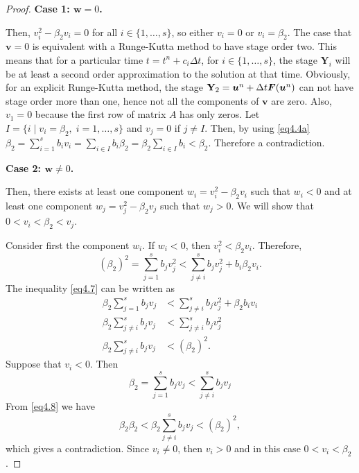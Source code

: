 \begin{proof}
    \noindent \textbf{Case 1: \( \bm{w} = 0 \).}

    Then, \( v_{i}^{2} - \beta_{2}v_{i} = 0 \) for all \( i \in \{1,\dots,s\} \), so either \( v_{i} = 0 \) or \( v_{i} = \beta_{2} \). The case that \( \bm{v} = 0 \) is equivalent with a Runge-Kutta method to have stage order two. This means that for a particular time \( t = t^{n} + c_{i}\Delta t \), for \( i \in \{1, \dots, s\} \), the stage \( \textbf{Y}_{i} \) will be at least a second order approximation to the solution at that time. Obviously, for an explicit Runge-Kutta method, the stage \( \textbf{Y}_{2} = \bm{u}^{n} + \Delta t\bm{F}(\bm{u}^{n}) \) can not have stage order more than one, hence not all the components of \( \bm{v} \) are zero. Also, \( v_{1} = 0 \) because the first row of matrix \( A \) has only zeros. Let \( I = \{ i \;|\; v_{i} = \beta_{2}, \; i = 1,\dots,s \} \) and \( v_{j} = 0 \) if \( j \neq I \). Then, by using \eqref{eq4.4a} \( \beta_{2} = \sum_{i=1}^{s}b_{i}v_{i} = \sum_{i \in I}b_{i}\beta_{2} = \beta_{2}\sum_{i \in I}b_{i} < \beta_{2} \). Therefore a contradiction.
    \newline

    \noindent \textbf{Case 2: \( \bm{w} \neq 0 \).}

    Then, there exists at least one component \( w_{i} = v_{i}^{2} - \beta_{2}v_{i} \) such that \( w_{i} < 0 \) and at least one component \( w_{j} = v_{j}^{2} - \beta_{2}v_{j} \) such that \( w_{j} > 0 \). We will show that \( 0 < v_{i} < \beta_{2} < v_{j} \).

    Consider first the component \( w_{i} \). If \( w_{i} < 0 \), then \( v_{i}^{2} < \beta_{2}v_{i} \). Therefore,
    \begin{equation}\label{eq4.7}
        (\beta_{2})^{2} = \sum_{j=1}^{s}b_{j}v_{j}^{2} < \sum_{j \neq i}^{s}b_{j}v_{j}^{2} + b_{i}\beta_{2}v_{i}.
    \end{equation}
    The inequality \eqref{eq4.7} can be written as
    \begin{equation}\label{eq4.8}
        \begin{split}
            \beta_{2}\sum_{j=1}^{s}b_{j}v_{j} &< \sum_{j \neq i}^{s}b_{j}v_{j}^{2} + \beta_{2}b_{i}v_{i} \\
            \beta_{2}\sum_{j \neq i}^{s}b_{j}v_{j} &< \sum_{j \neq i}^{s}b_{j}v_{j}^{2} \\
            \beta_{2}\sum_{j \neq i}^{s}b_{j}v_{j} &< (\beta_{2})^{2}.
        \end{split}
    \end{equation}
    Suppose that \( v_{i} < 0 \). Then
    \begin{equation*}
        \beta_{2} = \sum_{j=1}^{s}b_{j}v_{j} < \sum_{j \neq i}^{s}b_{j}v_{j}
    \end{equation*}
    From \eqref{eq4.8} we have
    \begin{equation*}
            \beta_{2}\beta_{2} < \beta_{2}\sum_{j \neq i}^{s}b_{j}v_{j} < (\beta_{2})^{2},
    \end{equation*}
    which gives a contradiction. Since \( v_{i} \neq 0 \), then \( v_{i} > 0 \) and in this case \( 0 < v_{i} < \beta_{2} \).


\end{proof}
